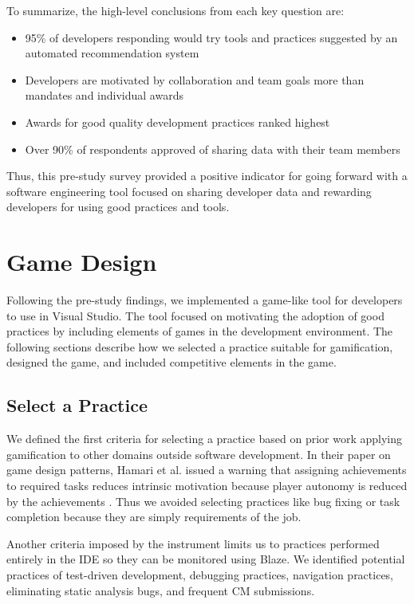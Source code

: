 \documentclass{sig-alternate}
\begin{document}
 To summarize, the high-level conclusions from each key question are:
\begin{itemize}[itemsep=0mm]
\item 95\% of developers responding would try tools and practices suggested by an automated recommendation system 
\item Developers are motivated by collaboration and team goals more than mandates and individual awards
\item Awards for good quality development practices ranked highest
\item Over 90\% of respondents approved of sharing data with their team members
\end{itemize}
Thus, this pre-study survey provided a positive indicator for going forward with a software engineering tool focused on sharing developer data and rewarding developers for using good practices and tools. 

\section{Game Design}


Following the pre-study findings, we implemented a game-like tool for developers to use in Visual Studio.  The tool focused on motivating the adoption of good practices by including elements of games in the development environment.  The following sections describe how we selected a practice suitable for gamification, designed the game, and included competitive elements in the game.

\subsection{Select a Practice}

We defined the first criteria for selecting a practice based on prior work  applying gamification to other domains outside software development. 
In their paper on game design patterns, Hamari et al. issued a warning that assigning achievements to required tasks reduces intrinsic motivation because player autonomy is reduced by the achievements \cite{wbsnipes:Hamari2011Framework}.  Thus we avoided selecting practices like bug fixing or task completion because they are simply requirements of the job.  

Another criteria imposed by the instrument limits us to practices performed entirely in the IDE so they can be monitored using Blaze.  We identified potential practices of test-driven development, debugging practices, navigation practices,  eliminating static analysis bugs, and frequent CM submissions.  
\end{document}
